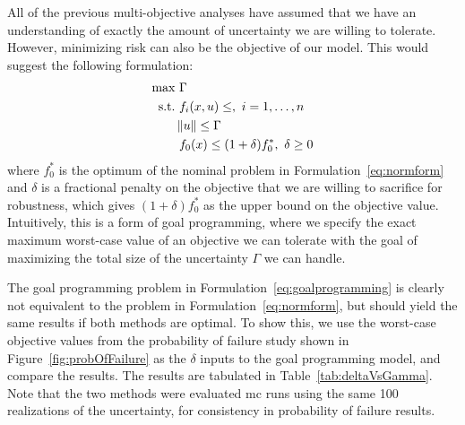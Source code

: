 All of the previous multi-objective analyses have assumed that we have an
understanding of exactly the amount of uncertainty we are
willing to tolerate. However, minimizing risk can also be the objective of our
model. This would suggest the following formulation:
\begin{equation}
    \begin{split}
    \text{max} &~\Gamma \\
    \text{s.t.}     &~f_i(x,u) \leq,~i = 1,\ldots,n \\
                    & \left\lVert u\right\rVert \leq \Gamma \\
                    &~f_0(x) \leq (1+\delta)f_0^*,~\delta \geq 0
    \end{split}
    \label{eq:goalprogramming}
\end{equation}
where $f_0^*$ is the optimum of the nominal problem in Formulation~\ref{eq:normform} and $\delta$
is a fractional penalty on the objective that we are willing to sacrifice for robustness, which
gives $(1+\delta)f_0^*$ as the upper bound on the objective value. Intuitively,
this is a form of goal programming,
where we specify the exact maximum worst-case value of an objective we can tolerate with
the goal of maximizing the total size of the uncertainty $\Gamma$ we can handle.

The goal programming problem in Formulation~\ref{eq:goalprogramming} is clearly
not equivalent to the problem in Formulation~\ref{eq:normform},
but should yield the same results if both methods are optimal.
To show this, we use the worst-case objective values from the probability of failure study
shown in Figure~\ref{fig:probOfFailure} as the $\delta$ inputs to the goal programming model, and compare the results.
The results are tabulated in
Table~\ref{tab:deltaVsGamma}. Note that the two methods were evaluated \gls{mc} runs using the same 100 realizations
of the uncertainty, for consistency in probability of failure results.

